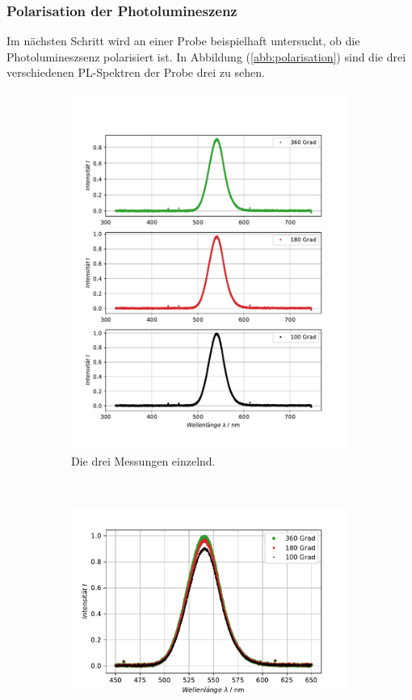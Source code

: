 \subsubsection{Polarisation der Photolumineszenz}
Im n\"{a}chsten Schritt wird an einer Probe beispielhaft untersucht, ob die Photolumineszsenz polarisiert ist.
In Abbildung (\ref{abb:polarisation}) sind die drei verschiedenen PL-Spektren der Probe drei zu sehen.
\begin{figure}[H]
\centering
	\begin{subfigure}[t]{0.4\textwidth}
	\includegraphics[width=\textwidth]{Plots/aufgabe1b_korrek.pdf}
	\caption{Die drei Messungen einzelnd.}
	\label{abb:polarisation_einzelnd}
	\end{subfigure}
	~
	\begin{subfigure}[t]{0.4\textwidth}
	\includegraphics[width=\textwidth]{Plots/aufgabe1b.pdf}

\end{subfigure}
\end{figure}
